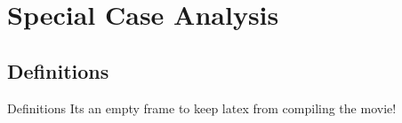 \section{Special Case Analysis}

\subsection{Definitions}

\begin{frame}{Definitions}
  Its an empty frame to keep latex from compiling the movie!






\end{frame}


  
